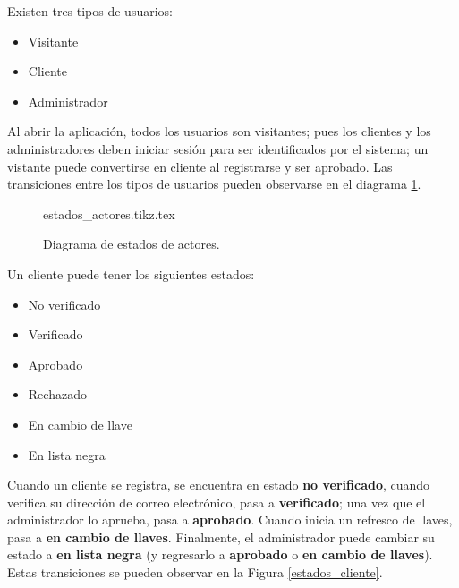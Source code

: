{
  Existen tres tipos de usuarios:
  \begin{itemize}
    \item Visitante
    \item Cliente
    \item Administrador
  \end{itemize}

  \begin{hangparas}{2em}{0}
    Al abrir la aplicación, todos los usuarios son visitantes; pues los clientes
    y los administradores deben iniciar sesión para ser identificados por el
    sistema; un vistante puede convertirse en cliente al registrarse y ser
    aprobado. Las transiciones entre los tipos de usuarios pueden observarse en
    el diagrama \ref{estados_actores}.
  \end{hangparas}
}

\begin{figure}
  \begin{center}
    {estados_actores.tikz.tex}
    \caption{Diagrama de estados de actores.}
    \label{estados_actores}
  \end{center}
\end{figure}


{
  Un cliente puede tener los siguientes estados:
  \begin{itemize}
    \item No verificado
    \item Verificado
    \item Aprobado
    \item Rechazado
    \item En cambio de llave
    \item En lista negra
  \end{itemize}

  \begin{hangparas}{2em}{0}
    Cuando un cliente se registra, se encuentra en estado \textbf{no verificado},
    cuando verifica su dirección de correo electrónico, pasa a
    \textbf{verificado}; una vez que el administrador lo aprueba, pasa a
    \textbf{aprobado}. Cuando inicia un refresco de llaves, pasa a
    \textbf{en cambio de llaves}. Finalmente, el administrador puede cambiar su
    estado a \textbf{en lista negra} (y regresarlo a \textbf{aprobado} o
    \textbf{en cambio de llaves}). Estas transiciones se pueden observar en la
    Figura \ref{estados_cliente}.
  \end{hangparas}
}

